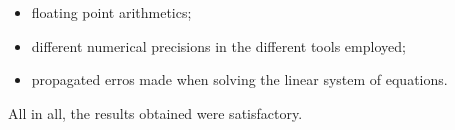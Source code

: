 \begin{itemize}
\item floating point arithmetics;
\item different numerical precisions in the different tools employed;
\item propagated erros made when solving the linear system of equations.
\end{itemize}



All in all, the results obtained were satisfactory.


